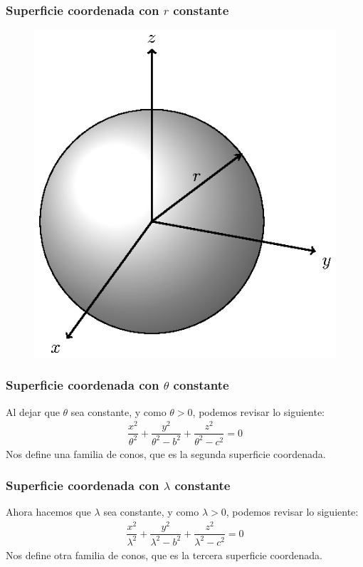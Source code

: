 \documentclass[12pt]{beamer}
\begin{document}
\begin{frame}
\frametitle{Superficie coordenada con $r$ constante}
\begin{figure}
  \centering
  \includegraphics[scale=1]{Imagenes/Sistema_Conico_Superficie_Constante_01.eps}
\end{figure}
\end{frame}
\begin{frame}
\frametitle{Superficie coordenada con $\theta$ constante}
Al dejar que $\theta$ sea constante, y como $\theta > 0$, podemos revisar lo siguiente:
\pause
\begin{align*}
\dfrac{x^{2}}{\theta^{2}} + \dfrac{y^{2}}{\theta^{2} - b^{2}} + \dfrac{z^{2}}{\theta^{2} - c^{2}} = 0
\end{align*}
\pause
Nos define una familia de conos, que es la segunda superficie coordenada.
\end{frame}
\begin{frame}
\frametitle{Superficie coordenada con $\lambda$ constante}
Ahora hacemos que $\lambda$ sea constante, y como $\lambda > 0$, podemos revisar lo siguiente:
\pause
\begin{align*}
\dfrac{x^{2}}{\lambda^{2}} + \dfrac{y^{2}}{\lambda^{2} - b^{2}} + \dfrac{z^{2}}{\lambda^{2} - c^{2}} = 0
\end{align*}
\pause
Nos define otra familia de conos, que es la tercera superficie coordenada.
\end{frame}
\end{document}
